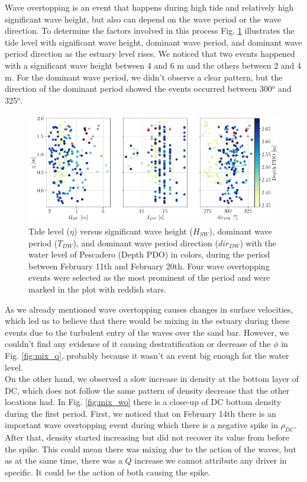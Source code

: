 \documentclass[tesis.tex]{subfiles}
\begin{document}
Wave overtopping is an event that happens during high tide and relatively high significant wave height, but also can depend on the wave period or the wave direction. To determine the factors involved in this process Fig. \ref{fig:WO} illustrates the tide level with significant wave height, dominant wave period, and dominant wave period direction as the estuary level rises. We noticed that two events happened with a significant wave height between 4 and 6 m and the others between 2 and 4 m. For the dominant wave period, we didn't observe a clear pattern, but the direction of the dominant period showed the events occurred between 300$^o$ and 325$^o$. \\

\begin{figure}[h!]
    \centering
    \includegraphics[width=\textwidth]{Imagenes/WO.png}
    \caption{Tide level ($\eta$) versus significant wave height ($H_{SW}$), dominant wave period ($T_{DW}$), and dominant wave period direction ($dir_{DW}$) with the water level of Pescadero (Depth PDO) in colors, during the period between February 11th and February 20th. Four wave overtopping events were selected as the most prominent of the period and were marked in the plot with reddish stars. }
    \label{fig:WO}
\end{figure}

As we already mentioned wave overtopping causes changes in surface velocities, which led us to believe that there would be mixing in the estuary during these events due to the turbulent entry of the waves over the sand bar. However, we couldn't find any evidence of it causing destratification or decrease of the $\phi$ in Fig. \ref{fig:mix_q}, probably because it wasn't an event big enough for the water level. \\

On the other hand, we observed a slow increase in density at the bottom layer of DC, which does not follow the same pattern of density decrease that the other locations had. In Fig. \ref{fig:mix_wo} there is a close-up of DC bottom density during the first period. First, we noticed that on February 14th there is an important wave overtopping event during which there is a negative spike in $\rho_{DC}$. After that, density started increasing but did not recover its value from before the spike. This could mean there was mixing due to the action of the waves, but as at the same time, there was a $Q$ increase we cannot attribute any driver in specific. It could be the action of both causing the spike.\\
\end{document}
